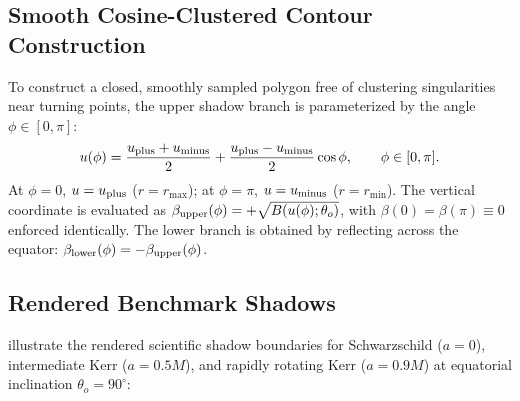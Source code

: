 \subsection{Smooth Cosine-Clustered Contour Construction}
\label{subsec:smooth_contour}
To construct a closed, smoothly sampled polygon free of clustering singularities near turning points, the upper shadow branch is parameterized by the angle $\phi \in [0, \pi]$:
\begin{equation}
    u(\phi) = \frac{u_{\rm plus} + u_{\rm minus}}{2} + \frac{u_{\rm plus} - u_{\rm minus}}{2} \cos\phi, \qquad \phi \in [0, \pi].
    \label{eq:cosine_clustered_u}
\end{equation}
At $\phi = 0$, $u = u_{\rm plus}$ ($r = r_{\max}$); at $\phi = \pi$, $u = u_{\rm minus}$ ($r = r_{\min}$). The vertical coordinate is evaluated as $\beta_{\rm upper}(\phi) = +\sqrt{B(u(\phi); \theta_o)}$, with $\beta(0) = \beta(\pi) \equiv 0$ enforced identically. The lower branch is obtained by reflecting across the equator: $\beta_{\rm lower}(\phi) = -\beta_{\rm upper}(\phi)$.

\subsection{Rendered Benchmark Shadows}
 illustrate the rendered scientific shadow boundaries for Schwarzschild ($a = 0$), intermediate Kerr ($a = 0.5M$), and rapidly rotating Kerr ($a = 0.9M$) at equatorial inclination $\theta_o = 90^\circ$:


